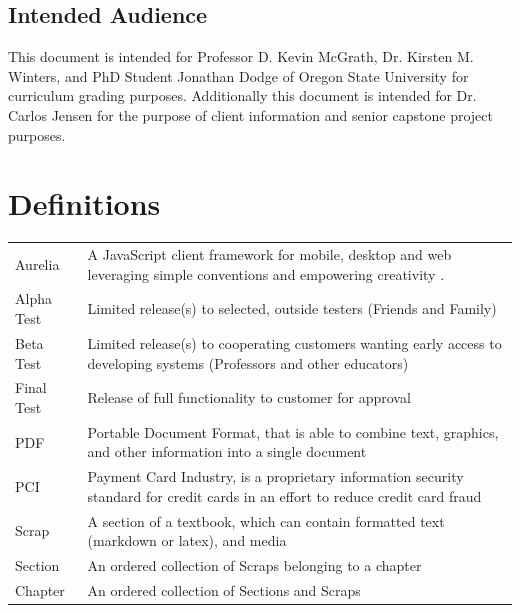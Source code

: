 \documentclass[onecolumn, draftclsnofoot,10pt, compsoc]{IEEEtran}
\begin{document}
\subsection{Intended Audience}
\noindent This document is intended for Professor D. Kevin McGrath,
Dr. Kirsten M. Winters, and PhD Student Jonathan Dodge of Oregon State
University for curriculum grading purposes.
Additionally this document is intended for Dr. Carlos Jensen for the
purpose of client information and senior capstone project purposes.

\section{Definitions}
\begin{center}


\begin{supertabular}{p{3cm}p{12cm}}

	Aurelia 
	& A JavaScript client framework for mobile, desktop and web leveraging
	simple conventions and empowering creativity \cite{Aurelia}. \\

	Alpha Test 
	& Limited release(s) to selected, outside testers (Friends and Family)\\

	Beta Test 
	& Limited release(s) to cooperating customers wanting early
	access to developing systems (Professors and other educators)\\

	Final Test 
	& Release of full functionality to customer for approval \\

	PDF 
	& Portable Document Format, that is able to combine text,
	graphics, and other information into a single document \\

	PCI 
	& Payment Card Industry, is a proprietary information security
	standard for credit cards in an effort to reduce credit card fraud \\

	Scrap 
	& A section of a textbook, which can contain formatted text 
	(markdown or latex), and media \\

	Section 
	& An ordered collection of Scraps belonging to a chapter\\

	Chapter 
	& An ordered collection of Sections and Scraps\\


\end{supertabular}
\end{center}
\end{document}
